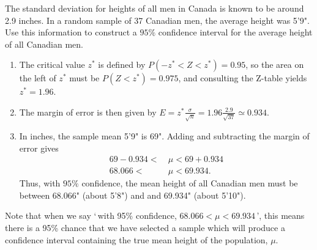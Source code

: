 \begin{example} 
The standard deviation for heights of all men in Canada is known to be around 2.9 inches. In a random sample of 37 Canadian men, the average height was 5'9". Use this information to construct a $95\%$ confidence interval for the average height of all Canadian men.
\begin{enumerate}[label=\textnormal{\Roman*}.]
\item The critical value $z^*$ is defined by $P(-z^* < Z < z^*) = 0.95$, so the area on the left of $z^*$ must be $P(Z < z^*) = 0.975$, and consulting the Z-table yields $z^* = 1.96$.
\begin{center}
\end{center}
\item The margin of error is then given by $E = z^*  \frac{\sigma}{\sqrt{n}} = 1.96  \frac{2.9}{\sqrt{37}} \simeq 0.934$. 
\item In inches, the sample mean 5'9" is 69". Adding and subtracting the margin of error gives
$$\begin{aligned}69-0.934 < \ &\mu < 69+0.934 \\
68.066 < \ &\mu < 69.934.\end{aligned}$$
Thus, with $95\%$ confidence, the mean height of all Canadian men must be between 68.066" (about 5'8") and and 69.934" (about 5'10").
\end{enumerate}
\end{example}

Note that when we say `\,with 95\% confidence, $68.066 < \mu < 69.934$\,', this means there is a 95\% chance that we have selected a sample which will produce a confidence interval containing the true mean height of the population, $\mu$.

